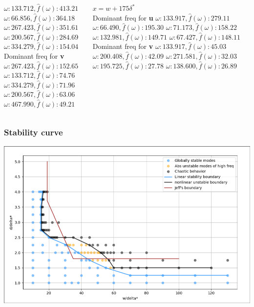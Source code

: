 \documentclass[
  aspectratio=169, %
  t, %
  onlytextwidth, %
  10pt, %
]{beamer}
\begin{document}
\begin{frame}
\begin{columns}[T]
\begin{column}{0.245\linewidth}
			$ \omega : 133.712, \widehat{f}(\omega): 413.21$
			$ \omega : 66.856, \widehat{f}(\omega): 364.18$
			$ \omega : 267.423, \widehat{f}(\omega): 351.61$
			$ \omega : 200.567, \widehat{f}(\omega): 284.69$
			$ \omega : 334.279, \widehat{f}(\omega): 154.04$\\
			Dominant freq for \textbf{v}
			$ \omega : 267.423, \widehat{f}(\omega): 152.65$
			$ \omega : 133.712, \widehat{f}(\omega): 74.76$
			$ \omega : 334.279, \widehat{f}(\omega): 71.96$
			$ \omega : 200.567, \widehat{f}(\omega): 63.06$
			$ \omega : 467.990, \widehat{f}(\omega): 49.21$
		\end{column}
		\begin{column}{0.245\linewidth} %
			$x=w+175\delta^*$\\
			Dominant freq for \textbf{u}
			$ \omega : 133.917, \widehat{f}(\omega): 279.11$
			$ \omega : 66.490, \widehat{f}(\omega): 195.30$
			$ \omega : 71.173, \widehat{f}(\omega): 158.22$
			$ \omega : 132.981, \widehat{f}(\omega): 149.71$
			$ \omega : 67.427, \widehat{f}(\omega): 148.11$
			Dominant freq for \textbf{v}
			$ \omega : 133.917, \widehat{f}(\omega): 45.03$
			$ \omega : 200.408, \widehat{f}(\omega): 42.09$
			$ \omega : 271.581, \widehat{f}(\omega): 32.03$
			$ \omega : 195.725, \widehat{f}(\omega): 27.78$
			$ \omega : 138.600, \widehat{f}(\omega): 26.89$

		\end{column}
	\end{columns}
	\centering
\end{frame}
\begin{frame}
	\frametitle{Stability curve}
	\centering
	\includegraphics[width=0.75\linewidth]{Images/stabilitycurve.png}
\end{frame}
\end{document}
